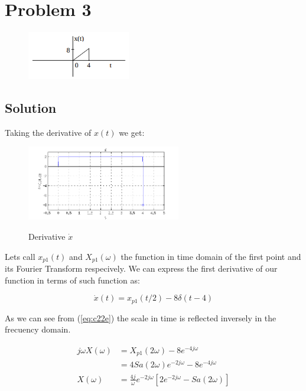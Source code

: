 \section*{Problem 3}

\begin{figure}[H]
\caption*{}
\centering
\includegraphics[width=0.4\textwidth]{figs/c2p3.png}
\label{fig:c2p3}
\end{figure} 

\subsection*{Solution}

Taking the derivative of $x(t)$ we get:

\begin{figure}[H]
\caption{Derivative $\dot{x}$}
\centering
\includegraphics[width=0.6\textwidth]{figs/c2p3dotx.png}
\label{fig:c2p3dotx}
\end{figure}


Lets call $x_{p1}(t)$ and $X_{p1}(\omega)$ the function in time domain of the first point 
and its Fourier Transform respecively. 
We can express the first derivative of our function in terms of such function as:

\begin{equation*}
\dot{x}(t) = x_{p1}(t/2) - 8 \delta(t-4)
\end{equation*} 

As we can see from (\ref{eq:c22e}) the scale in time is reflected inversely
in the frecuency domain. 

\begin{equation*}
\begin{aligned}
j \omega X(\omega) &= X_{p1}(2 \omega) - 8 e^{-4 j \omega} \\
 &= 4 Sa(2 \omega) e^{- 2 j \omega}- 8e^{-4 j \omega} \\
X(\omega) &= \frac{4 j}{\omega} e^{-2 j \omega} [2 e^{-2 j \omega}- Sa(2 \omega)]
\end{aligned}
\end{equation*} 

